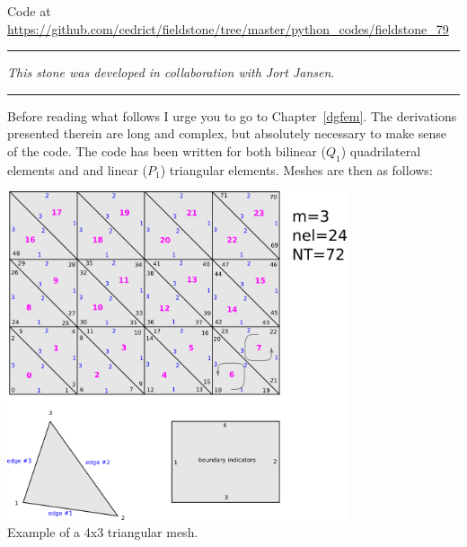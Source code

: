 

\begin{center}
Code at \url{https://github.com/cedrict/fieldstone/tree/master/python_codes/fieldstone_79}
\end{center}

\par\noindent\rule{\textwidth}{0.4pt}

{\sl This stone was developed in collaboration with Jort Jansen}. 

\par\noindent\rule{\textwidth}{0.4pt}


Before reading what follows I urge you to go to Chapter~\ref{dgfem}. The derivations 
presented therein are long and complex, but absolutely necessary to make sense of the code.  
The code has been written for both bilinear ($Q_1$) quadrilateral elements and 
and linear ($P_1$) triangular elements. Meshes are then as follows:

\begin{center}
\includegraphics[width=10cm]{python_codes/fieldstone_79/images/grids2D_tris}\\
{\captionfont Example of a 4x3 triangular mesh.}
\end{center}

